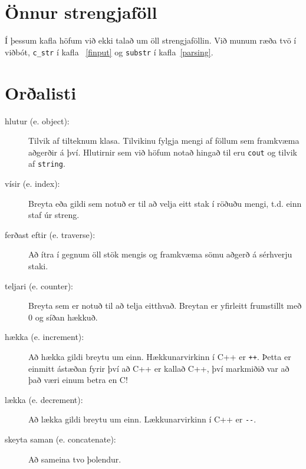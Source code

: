 \section{Önnur strengjaföll}

Í þessum kafla höfum við ekki talað um öll strengjaföllin.
Við munum ræða tvö í viðbót, {\tt c\_str} í kafla ~\ref{finput} og {\tt substr} í kafla~\ref{parsing}.

\section{Orðalisti}

\begin{description}

\item[hlutur (e. object):] Tilvik af tilteknum klasa. Tilvikinu fylgja mengi af föllum sem framkvæma aðgerðir á því.
Hlutirnir sem við höfum notað hingað til eru {\tt cout} og tilvik af {\tt string}.

\item[vísir (e. index):]  Breyta eða gildi sem notuð er til að velja eitt stak í röðuðu mengi, t.d. einn staf úr streng.

\item[ferðast eftir (e. traverse):]  Að ítra í gegnum öll stök mengis og framkvæma sömu aðgerð á sérhverju staki.

\item[teljari (e. counter):]  Breyta sem er notuð til að telja eitthvað. Breytan er yfirleitt frumstillt með 0 og síðan hækkuð.

\item[hækka (e. increment):]  Að hækka gildi breytu um einn.
Hækkunarvirkinn í C++ er {\tt ++}.  Þetta er einmitt ástæðan fyrir því að C++ er kallað C++, því markmiðið var að það væri einum betra en C!

\item[lækka (e. decrement):]  Að lækka gildi breytu um einn.
Lækkunarvirkinn í C++ er \verb+--+.

\item[skeyta saman (e. concatenate):] Að sameina tvo þolendur.


\end{description}
